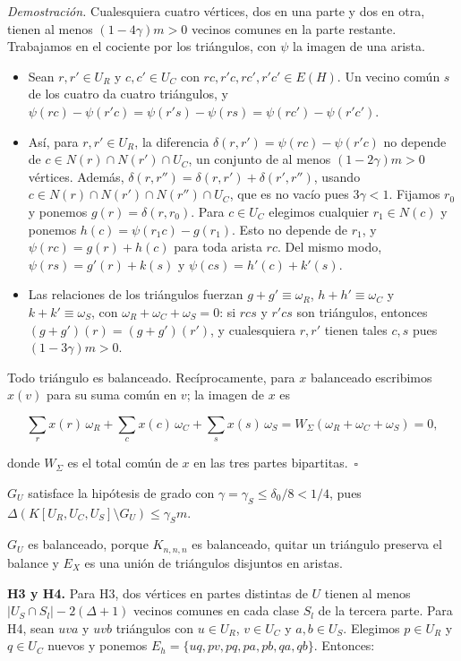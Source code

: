 \documentclass[spanish,11pt,a4paper]{article}
\providecommand{\tightlist}{\setlength{\itemsep}{0pt}\setlength{\parskip}{0pt}}
\begin{document}
\emph{Demostración.} Cualesquiera cuatro vértices, dos en una parte y dos en otra, tienen al menos \((1-4\gamma)m>0\) vecinos comunes en la parte restante. Trabajamos en el cociente por los triángulos, con \(\psi\) la imagen de una arista.

\begin{itemize}
\tightlist
\item
  Sean \(r,r'\in U_R\) y \(c,c'\in U_C\) con \(rc,r'c,rc',r'c'\in E(H)\). Un vecino común \(s\) de los cuatro da cuatro triángulos, y \(\psi(rc)-\psi(r'c)=\psi(r's)-\psi(rs)=\psi(rc')-\psi(r'c')\).
\item
  Así, para \(r,r'\in U_R\), la diferencia \(\delta(r,r')=\psi(rc)-\psi(r'c)\) no depende de \(c\in N(r)\cap N(r')\cap U_C\), un conjunto de al menos \((1-2\gamma)m>0\) vértices. Además, \(\delta(r,r'')=\delta(r,r')+\delta(r',r'')\), usando \(c\in N(r)\cap N(r')\cap N(r'')\cap U_C\), que es no vacío pues \(3\gamma<1\). Fijamos \(r_0\) y ponemos \(g(r)=\delta(r,r_0)\). Para \(c\in U_C\) elegimos cualquier \(r_1\in N(c)\) y ponemos \(h(c)=\psi(r_1c)-g(r_1)\). Esto no depende de \(r_1\), y \(\psi(rc)=g(r)+h(c)\) para toda arista \(rc\). Del mismo modo, \(\psi(rs)=g'(r)+k(s)\) y \(\psi(cs)=h'(c)+k'(s)\).
\item
  Las relaciones de los triángulos fuerzan \(g+g'\equiv\omega_R\), \(h+h'\equiv\omega_C\) y \(k+k'\equiv\omega_S\), con \(\omega_R+\omega_C+\omega_S=0\): si \(rcs\) y \(r'cs\) son triángulos, entonces \((g+g')(r)=(g+g')(r')\), y cualesquiera \(r,r'\) tienen tales \(c,s\) pues \((1-3\gamma)m>0\).
\end{itemize}

Todo triángulo es balanceado. Recíprocamente, para \(x\) balanceado escribimos \(x(v)\) para su suma común en \(v\); la imagen de \(x\) es

\nopagebreak[4]
\[\sum_r x(r)\,\omega_R+\sum_c x(c)\,\omega_C+\sum_s x(s)\,\omega_S=W_\Sigma(\omega_R+\omega_C+\omega_S)=0,\]

donde \(W_\Sigma\) es el total común de \(x\) en las tres partes bipartitas.~\(\square\)

\(G_U\) satisface la hipótesis de grado con \(\gamma=\gamma_S\le\delta_0/8<1/4\), pues \(\Delta(K[U_R,U_C,U_S]\setminus G_U)\le\gamma_Sm\).

\(G_U\) es balanceado, porque \(K_{n,n,n}\) es balanceado, quitar un triángulo preserva el balance y \(E_X\) es una unión de triángulos disjuntos en aristas.

\textbf{H3 y H4.} Para H3, dos vértices en partes distintas de \(U\) tienen al menos \(|U_S\cap S_l|-2(\Delta+1)\) vecinos comunes en cada clase \(S_l\) de la tercera parte. Para H4, sean \(uva\) y \(uvb\) triángulos con \(u\in U_R\), \(v\in U_C\) y \(a,b\in U_S\). Elegimos \(p\in U_R\) y \(q\in U_C\) nuevos y ponemos \(E_h=\{uq,pv,pq,pa,pb,qa,qb\}\). Entonces:
\end{document}
